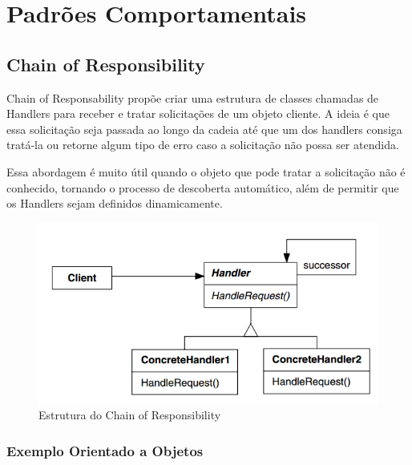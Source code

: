 \chapter{Padrões Comportamentais}

\section{Chain of Responsibility}

Chain of Responsability propõe criar uma estrutura de classes 
chamadas de Handlers para receber e tratar solicitações de um 
objeto cliente. A ideia é que essa solicitação seja passada ao 
longo da cadeia até que um dos handlers consiga tratá-la ou 
retorne algum tipo de erro caso a solicitação não possa ser 
atendida.

Essa abordagem é muito útil quando o objeto que pode tratar 
a solicitação não é conhecido, tornando o processo de 
descoberta automático, além de permitir que os Handlers sejam 
definidos dinamicamente.

\begin{figure}[htb]
	\caption{\label{chain_struct}Estrutura do Chain of Responsibility}
	\begin{center}
	    \includegraphics[scale=0.5]{5_padroes-contexto-funcional/5.3_comportamentais/5.3.01_chain-of-responsibility/diagram.png}
	\end{center}
\end{figure}

\subsection*{Exemplo Orientado a Objetos}

